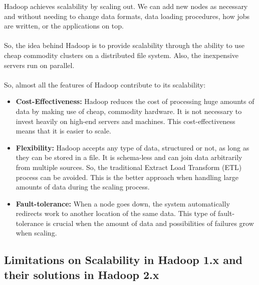 \documentclass[a4paper,12pt,oneside]{report}
\begin{document}
Hadoop achieves scalability by scaling out. We can add new nodes as necessary and without needing to change data formats, data loading procedures, how jobs are written, or the applications on top.\\
\\
So, the idea behind Hadoop is to provide scalability through the ability to use cheap commodity clusters on a distributed file system. 
Also, the inexpensive servers run on parallel.\\ 
\\
So, almost all the features of Hadoop contribute to its scalability:

\begin{itemize}

        \item \textbf{Cost-Effectiveness:} Hadoop reduces the cost of processing huge amounts of data by making use of cheap, commodity hardware. 
                It is not necessary to invest heavily on high-end servers and machines. 
                This cost-effectiveness means that it is easier to scale.

        \item \textbf{Flexibility:} Hadoop accepts any type of data, structured or not, as long as they can be stored in a file. 
                It is schema-less and can join data arbitrarily from multiple sources. 
                So, the traditional Extract Load Transform (ETL) process can be avoided. 
                This is the better approach when handling large amounts of data during the scaling process.

        \item \textbf{Fault-tolerance:} When a node goes down, the system automatically redirects work to another location of the same data. 
                This type of fault-tolerance is crucial when the amount of data and possibilities of failures grow when scaling.

\end{itemize}

\subsection{Limitations on Scalability in Hadoop 1.x and their solutions in Hadoop 2.x}
\end{document}
